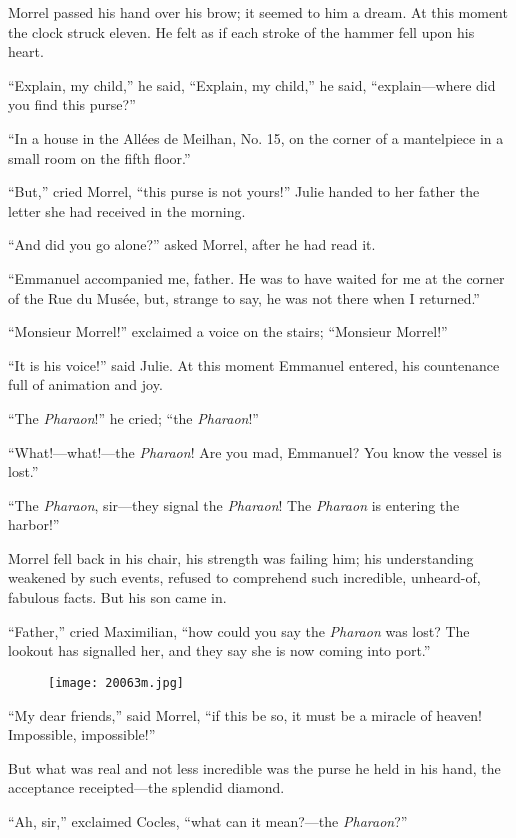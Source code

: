 Morrel passed his hand over his brow; it seemed to him a dream. At this
moment the clock struck eleven. He felt as if each stroke of the hammer
fell upon his heart.

“Explain, my child,” he said, “Explain, my child,” he said,
“explain—where did you find this purse?”

“In a house in the Allées de Meilhan, No. 15, on the corner of a
mantelpiece in a small room on the fifth floor.”

“But,” cried Morrel, “this purse is not yours!” Julie handed to her
father the letter she had received in the morning.

“And did you go alone?” asked Morrel, after he had read it.

“Emmanuel accompanied me, father. He was to have waited for me at the
corner of the Rue du Musée, but, strange to say, he was not there when
I returned.”

“Monsieur Morrel!” exclaimed a voice on the stairs; “Monsieur Morrel!”

“It is his voice!” said Julie. At this moment Emmanuel entered, his
countenance full of animation and joy.

“The \textit{Pharaon}!” he cried; “the \textit{Pharaon}!”

“What!—what!—the \textit{Pharaon}! Are you mad, Emmanuel? You know the vessel
is lost.”

“The \textit{Pharaon}, sir—they signal the \textit{Pharaon}! The \textit{Pharaon} is
entering the harbor!”

Morrel fell back in his chair, his strength was failing him; his
understanding weakened by such events, refused to comprehend such
incredible, unheard-of, fabulous facts. But his son came in.

“Father,” cried Maximilian, “how could you say the \textit{Pharaon} was lost?
The lookout has signalled her, and they say she is now coming into
port.”

\begin{figure}[ht]
\texttt{[image: 20063m.jpg]}
\end{figure}

“My dear friends,” said Morrel, “if this be so, it must be a miracle of
heaven! Impossible, impossible!”

But what was real and not less incredible was the purse he held in his
hand, the acceptance receipted—the splendid diamond.

“Ah, sir,” exclaimed Cocles, “what can it mean?—the \textit{Pharaon}?”

